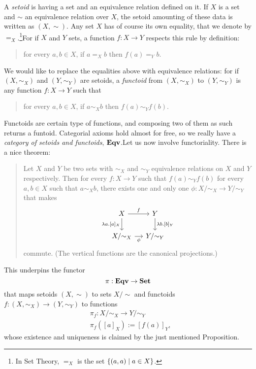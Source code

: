 \begin{example}\label{example:CategoryEqv}
  A {\em setoid}  is having a
  set and an equivalence relation defined on it. If \(X\) is a set and
  \(\sim\) an equivalence relation over \(X\), the setoid amounting of
  these data is written as \((X, \sim)\). Any set \(X\) has of course
  its own equality, that we denote by \(=_X\).\footnote{In Set Theory,
    \(=_X\) is the set \(\left\{(a, a) \mid a \in X\right\}\).}\newline For if
  \(X\) and \(Y\) sets, a function \(f : X \to Y\) respects this rule
  by definition:
  \begin{quotation}
    for every \(a, b \in X\), if \(a =_X b\) then \(f(a) =_Y b\).
  \end{quotation}
  We would like to replace the equalities above with equivalence
  relations: for if \((X, \sim_X)\) and \((Y, \sim_Y)\) are setoids, a
  {\em functoid}  from \((X, \sim_X)\) to \((Y, \sim_Y)\) is any
  function \(f : X \to Y\) such that
  \begin{quotation}
    for every \(a, b \in X\), if \(a \sim_X b\) then
    \(f(a) \sim_Y f(b)\).
  \end{quotation}
  Functoids are certain type of functions, and composing two of them
  as such returns a funtoid. Categorial axioms hold almost for free,
  so we really have a {\em category of setoids and functoids},
  \(\mathbf{Eqv}\).\newline Let us now involve functoriality. There is a nice
  theorem:
  \begin{quotation}
    Let \(X\) and \(Y\) be two sets with \(\sim_X\) and \(\sim_Y\)
    equivalence relations on \(X\) and \(Y\) respectively. Then for
    every \(f : X \to Y\) such that \(f(a) \sim_Y f(b)\) for every
    \(a, b \in X\) such that \(a \sim_X b\), there exists one and only
    one \(\phi : X{/}{\sim_X} \to Y{/}{\sim_Y}\) that makes
    \[\begin{tikzcd}[column sep=small]
        X \ar["f", r] \ar["{\lambda a.[a]_X}", d, swap] & Y \ar["{\lambda b.[b]_Y}", d] \\
        X{/}{\sim_X} \ar["\phi", r, swap] & Y{/}{\sim_Y}
      \end{tikzcd}\] commute. (The vertical functions are the
    canonical projections.)
  \end{quotation}
  This underpins the functor
  \[\pi : \mathbf{Eqv} \to \mathbf{Set}\]
  that maps setoids \((X, \sim)\) to sets \(X{/}{\sim}\) and functoids
  \(f : (X, \sim_X) \to (Y, \sim_Y)\) to functions
  \[\begin{aligned}
    & \pi_f : X{/}{\sim_X} \to Y{/}{\sim_Y} \\
    & \pi_f \left([a]_X\right) := \left[f(a)\right]_Y ,
  \end{aligned}\]
whose existence and uniqueness is claimed by the just mentioned Proposition.
\end{example}

